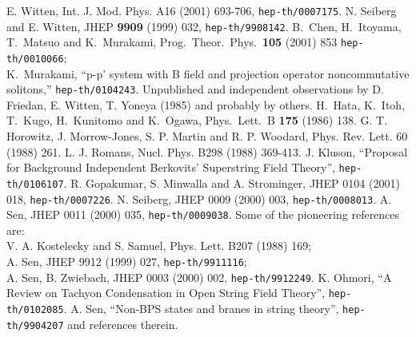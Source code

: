 \documentclass[a4paper,12pt]{article}
\begin{document}
\begin{thebibliography}{99}
E. Witten, Int. J. Mod. Phys. A16 (2001) 693-706,
{\tt hep-th/0007175}.
 N. Seiberg and E. Witten,
JHEP {\bf 9909} (1999) 032, {\tt hep-th/9908142}.
B.~Chen, H.~Itoyama, T.~Matsuo and K.~Murakami,
Prog.\ Theor.\ Phys.\  {\bf 105} (2001) 853
{\tt hep-th/0010066};\\
K.~Murakami,
``p-p' system with B field and projection operator noncommutative  solitons,''
{\tt hep-th/0104243}.
 Unpublished and independent
observations by D. Friedan, E. Witten,  T. Yoneya (1985)
and probably by others.
 H.~Hata, K.~Itoh, T.~Kugo, H.~Kunitomo and K.~Ogawa,
Phys.\ Lett.\ B {\bf 175} (1986) 138.
 G. T. Horowitz, J. Morrow-Jones, S. P. Martin
and R. P. Woodard, Phys. Rev. Lett. 60 (1988) 261.
 L. J. Romans, 
Nucl. Phys. B298 (1988) 369-413.
 J. Kluson, ``Proposal for Background Independent
Berkovits' Superstring Field Theory'', {\tt hep-th/0106107}.
 R. Gopakumar, S. Minwalla and A. Strominger,
JHEP 0104 (2001) 018, {\tt hep-th/0007226}.
 N. Seiberg, JHEP 0009 (2000) 003, 
{\tt hep-th/0008013}.
 A. Sen, JHEP 0011 (2000) 035, {\tt hep-th/0009038}.
 Some of the pioneering references are:\\
V. A. Kostelecky and S. Samuel, Phys. Lett. B207 (1988)  169;\\
A. Sen, JHEP 9912 (1999) 027, {\tt hep-th/9911116};\\
A. Sen, B. Zwiebach, JHEP 0003 (2000) 002, {\tt hep-th/9912249}.
 K. Ohmori, ``A Review on Tachyon Condensation
in Open String Field Theory'', {\tt hep-th/0102085}.
%
 A. Sen, ``Non-BPS states and branes in string theory'',
{\tt hep-th/9904207} and references therein.
\end{thebibliography}
\end{document}
